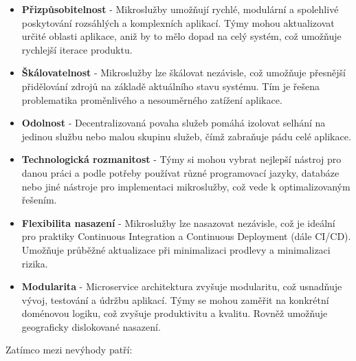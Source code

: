 \begin{itemize}

\item \textbf{Přizpůsobitelnost} - Mikroslužby umožňují rychlé, modulární a spolehlivé poskytování rozsáhlých a komplexních aplikací. Týmy mohou aktualizovat určité oblasti aplikace, aniž by to mělo dopad na celý systém, což umožňuje rychlejší iterace produktu.

\item \textbf{Škálovatelnost} - Mikroslužby lze škálovat nezávisle, což umožňuje přesnější přidělování zdrojů na základě aktuálního stavu systému. Tím je řešena problematika proměnlivého a nesouměrného zatížení aplikace.

\item \textbf{Odolnost} - Decentralizovaná povaha služeb pomáhá izolovat selhání na jedinou službu nebo malou skupinu služeb, čímž zabraňuje pádu celé aplikace.

\item \textbf{Technologická rozmanitost} - Týmy si mohou vybrat nejlepší nástroj pro danou práci a podle potřeby používat různé programovací jazyky, databáze nebo jiné nástroje pro implementaci mikroslužby, což vede k optimalizovaným řešením.

\item \textbf{Flexibilita nasazení} - Mikroslužby lze nasazovat nezávisle, což je ideální pro praktiky Continuous Integration a Continuous Deployment (dále CI/CD). Umožňuje průběžné aktualizace při minimalizaci prodlevy a minimalizaci rizika.

\item \textbf{Modularita} - Microservice architektura zvyšuje modularitu, což usnadňuje vývoj, testování a údržbu aplikací. Týmy se mohou zaměřit na konkrétní doménovou logiku, což zvyšuje produktivitu a kvalitu. Rovněž umožňuje geograficky dislokované nasazení.

\end{itemize}

Zatímco mezi nevýhody patří:

